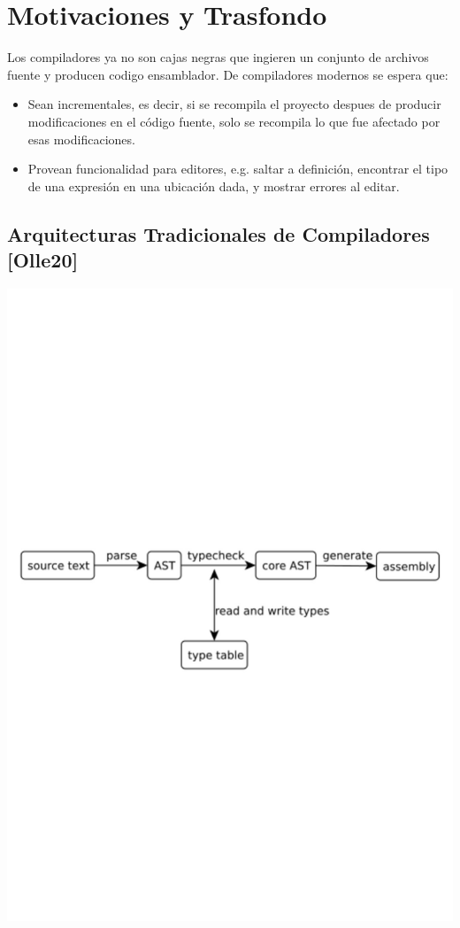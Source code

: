 \documentclass[12pt, a4paper]{report}
\begin{document}
\chapter*{Motivaciones y Trasfondo}

  Los compiladores ya no son cajas negras que ingieren un conjunto de archivos fuente y producen codigo ensamblador.
  De compiladores modernos se espera que:

  \begin{itemize}[noitemsep]

    \item Sean incrementales, es decir, si se recompila el proyecto despues de producir modificaciones en el código fuente, solo se recompila lo que fue afectado por esas modificaciones.

    \item Provean funcionalidad para editores, e.g. saltar a definición, encontrar el tipo de una expresión en una ubicación dada, y mostrar errores al editar.

  \end{itemize}

  \section*{Arquitecturas Tradicionales de Compiladores [Olle20]}

    \noindent
    \includegraphics[width=\textwidth]{olle_trad_comp_arq}
    \cite{olle_query_based}
\end{document}
